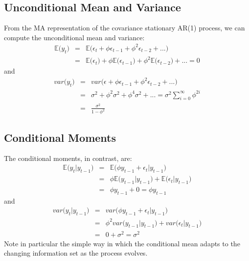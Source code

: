 \subsection{Unconditional Mean and Variance}
From the MA representation of the covariance stationary AR(1) process, we can compute the unconditional mean and variance:
\begin{eqnarray}
\nonumber
\mathbb{E}\big(y_{t}\big) &=& \mathbb{E}\big(\epsilon_{t} + \phi\epsilon_{t - 1} + \phi^{2}\epsilon_{t - 2} + ...\big)\\
&=& \mathbb{E}\big(\epsilon_{t}\big) + \phi\mathbb{E}\big(\epsilon_{t - 1}\big) + \phi^{2}\mathbb{E}\big(\epsilon_{t - 2}\big) + ... = 0
\end{eqnarray}
and
\begin{eqnarray}
	\nonumber
	var\big(y_{t}\big) &=& var\big(\epsilon + \phi\epsilon_{t - 1} + \phi^{2}\epsilon_{t - 2} + ...\big)\\
	\nonumber
	&=& \sigma^{2} + \phi^{2}\sigma^{2} + \phi^{4}\sigma^{2} + ... = \sigma^{2}\sum_{i = 0}^{\infty}\phi^{2i}\\
	&=& \frac{\sigma^{2}}{1 - \phi^{2}}
\end{eqnarray}

\subsection{Conditional Moments}
The conditional moments, in contrast, are:
\begin{eqnarray}
	\nonumber
	\mathbb{E}\Big(y_{t}\vert y_{t - 1}\Big) &=& \mathbb{E}\Big(\phi y_{t - 1} + \epsilon_{t}\vert y_{t - 1}\Big)\\
	\nonumber
	&=& \phi\mathbb{E}\Big(y_{t - 1}\vert y_{t - 1}\Big) + \mathbb{E}\Big(\epsilon_{t}\vert y_{t - 1}\Big)\\
	&=& \phi y_{t - 1} + 0 = \phi y_{t - 1}
\end{eqnarray}
and
\begin{eqnarray}
	\nonumber
	var\Big(y_{t}\vert y_{t - 1}\Big) &=& var\Big(\phi y_{t - 1} + \epsilon_{t}\vert y_{t - 1}\Big)\\
	\nonumber
	&=& \phi^{2}var\Big(y_{t - 1}\vert y_{t - 1}\Big) + var\Big(\epsilon_{t}\vert y_{t - 1}\Big)\\
	&=& 0 + \sigma^{2} = \sigma^{2}
\end{eqnarray}
Note in particular the simple way in which the conditional mean adapts to the changing information set as the process evolves.

